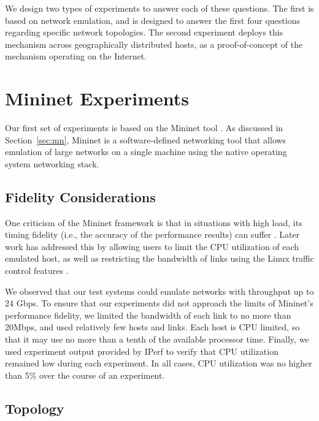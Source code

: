 \documentclass{cwru}
\begin{document}
We design two types of experiments to answer each of these questions. The first
is based on network emulation, and is designed to answer the first four
questions regarding specific network topologies. The second experiment deploys
this mechanism across geographically distributed hosts, as a proof-of-concept of
the mechanism operating on the Internet.

\section{Mininet Experiments}

Our first set of experiments is based on the Mininet tool \cite{mininet}. As
discussed in Section~\ref{sec:mn}, Mininet is a software-defined networking tool
that allows emulation of large networks on a single machine using the native
operating system networking stack.

\subsection{Fidelity Considerations}

One criticism of the Mininet framework is that in situations with high load, its
timing fidelity (i.e., the accuracy of the performance results) can suffer
\cite{lantz2010network}. Later work has addressed this by allowing users to
limit the CPU utilization of each emulated host, as well as restricting the
bandwidth of links using the Linux traffic control features
\cite{handigol2012reproducible}.

We observed that our test systems could emulate networks with throughput up to
24 Gbps. To ensure that our experiments did not approach the limits of Mininet's
performance fidelity, we limited the bandwidth of each link to no more than
20Mbps, and used relatively few hosts and links. Each host is CPU limited, so
that it may use no more than a tenth of the available processor time. Finally,
we used experiment output provided by IPerf to verify that CPU utilization
remained low during each experiment. In all cases, CPU utilization was no higher
than 5\% over the course of an experiment.

\subsection{Topology}
\end{document}
